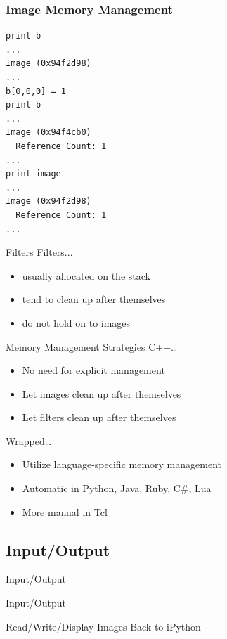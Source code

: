 \begin{frame}[fragile]
\frametitle{Image Memory Management}
\lstpython
\begin{lstlisting}
print b
...
Image (0x94f2d98)
...
b[0,0,0] = 1
print b
...
Image (0x94f4cb0)
  Reference Count: 1
...
print image
...
Image (0x94f2d98)
  Reference Count: 1
...
\end{lstlisting}
\end{frame}


\begin{frame}{Filters}
Filters...
\begin{itemize}
  \item usually allocated on the stack
  \item tend to clean up after themselves
  \item do not hold on to images
\end{itemize}
\end{frame}

\begin{frame}{Memory Management Strategies}
C++\dots
\begin{itemize}
  \item No need for explicit management
  \item Let images clean up after themselves
  \item Let filters clean up after themselves
\end{itemize}
Wrapped\dots
\begin{itemize}
  \item Utilize language-specific memory management
  \item Automatic in Python, Java, Ruby, C\#, Lua
  \item More manual in Tcl
\end{itemize}
\end{frame}

\subsection{Input/Output}

\begin{frame}{Input/Output}
\fontsize{36pt}{36pt}\selectfont
\center
\begin{center}
Input/Output
\end{center}
\end{frame}

\begin{frame}{Read/Write/Display Images}
  Back to iPython
\end{frame}


